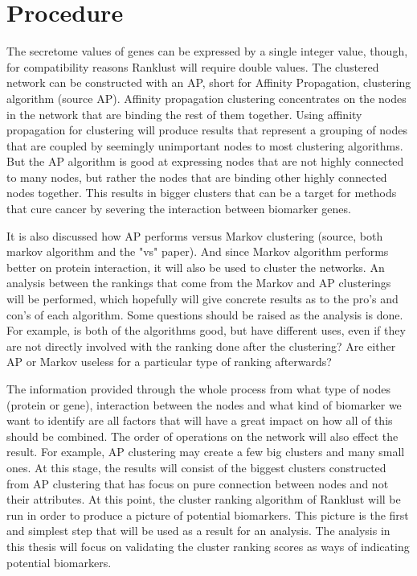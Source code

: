 \documentclass[UKenglish]{ifimaster}
\begin{document}

\part{Procedure}
The secretome values of genes can be expressed by a single integer value,
though, for compatibility reasons Ranklust will require double values. The
clustered network can be constructed with an AP, short for Affinity Propagation,
clustering algorithm (source AP). Affinity propagation clustering concentrates
on the nodes in the network that are binding the rest of them together. Using
affinity propagation for clustering will produce results that represent a
grouping of nodes that are coupled by seemingly unimportant nodes to most
clustering algorithms. But the AP algorithm is good at expressing nodes that are
not highly connected to many nodes, but rather the nodes that are binding other
highly connected nodes together. This results in bigger clusters that can be a
target for methods that cure cancer by severing the interaction between
biomarker genes.

It is also discussed how AP performs versus Markov clustering (source, both
markov algorithm and the "vs" paper). And since Markov algorithm performs better
on protein interaction, it will also be used to cluster the networks. An
analysis between the rankings that come from the Markov and AP clusterings will
be performed, which hopefully will give concrete results as to the pro's and
con's of each algorithm. Some questions should be raised as the analysis is
done. For example, is both of the algorithms good, but have different uses, even
if they are not directly involved with the ranking done after the clustering?
Are either AP or Markov useless for a particular type of ranking afterwards?

The information provided through the whole process from what type of nodes
(protein or gene), interaction between the nodes and what kind of biomarker we
want to identify are all factors that will have a great impact on how all of
this should be combined. The order of operations on the network will also effect
the result. For example, AP clustering may create a few big clusters and many
small ones. At this stage, the results will consist of the biggest clusters
constructed from AP clustering that has focus on pure connection between nodes
and not their attributes. At this point, the cluster ranking algorithm of
Ranklust will be run in order to produce a picture of potential biomarkers. This
picture is the first and simplest step that will be used as a result for an
analysis. The analysis in this thesis will focus on validating the cluster
ranking scores as ways of indicating potential biomarkers. 
\end{document}

